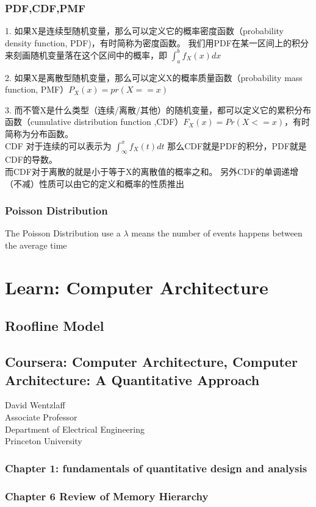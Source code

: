 \documentclass[UTF8]{article}
\begin{document}
\subsubsection{PDF,CDF,PMF}
1. 如果X是连续型随机变量，那么可以定义它的概率密度函数（probability density function, PDF)，有时简称为密度函数。 我们用PDF在某一区间上的积分来刻画随机变量落在这个区间中的概率，即 $\int^b_a f_X(x) dx$ 

2. 如果X是离散型随机变量，那么可以定义X的概率质量函数（probability mass function, PMF）$P_X(x) = pr(X == x)$

3. 而不管X是什么类型（连续/离散/其他）的随机变量，都可以定义它的累积分布函数（cumulative distribution function ,CDF）$F_X(x) = Pr(X <= x)$，有时简称为分布函数。 \\CDF 对于连续的可以表示为 $\int_{\infty}^x f_X(t) dt$ 那么CDF就是PDF的积分，PDF就是CDF的导数。 \\而CDF对于离散的就是小于等于X的离散值的概率之和。 另外CDF的单调递增（不减）性质可以由它的定义和概率的性质推出
\subsubsection{Poisson Distribution}
The Poisson Distribution use a $\lambda$ means the number of events happens between the average time 
\section{Learn: Computer Architecture}
\subsection{Roofline Model}
\subsection{Coursera: Computer Architecture, Computer Architecture: A Quantitative Approach}
David Wentzlaff\\
Associate Professor\\
Department of Electrical Engineering\\
Princeton University\\

\subsubsection{Chapter 1: fundamentals of quantitative design and analysis}
\subsubsection{Chapter 6 Review of Memory Hierarchy}
\end{document}
